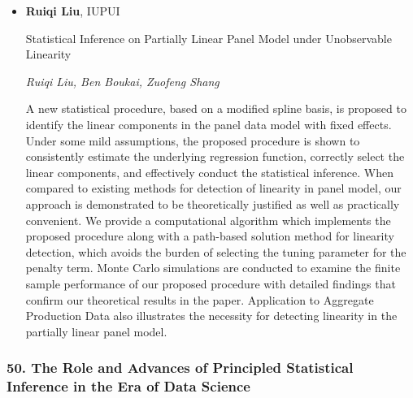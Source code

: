 \begin{itemize}
\item \textbf{Ruiqi Liu}, IUPUI

Statistical Inference on Partially Linear Panel Model under Unobservable Linearity

\emph{\footnotesize Ruiqi Liu, Ben Boukai, Zuofeng Shang}

A new statistical procedure,  based on a modified spline basis, is proposed to identify the linear components in the panel data model with fixed effects. Under some mild assumptions, the proposed procedure is shown to consistently estimate the underlying regression function,  correctly select the linear components, and effectively conduct the statistical inference. When compared to existing methods for detection of  linearity in panel model, our approach is demonstrated to be  theoretically justified as well as practically convenient. We provide a computational algorithm which implements the proposed procedure along with a path-based solution method for linearity detection, which avoids the burden of selecting the tuning parameter for the penalty term. Monte Carlo simulations are conducted to examine the finite sample performance of our proposed procedure with detailed findings that confirm our theoretical results in the paper. Application to  Aggregate Production Data also illustrates the necessity for detecting linearity in the partially linear panel model.

\end{itemize}

\subsubsection*{50. The Role and Advances of Principled Statistical Inference in the Era of Data Science}

